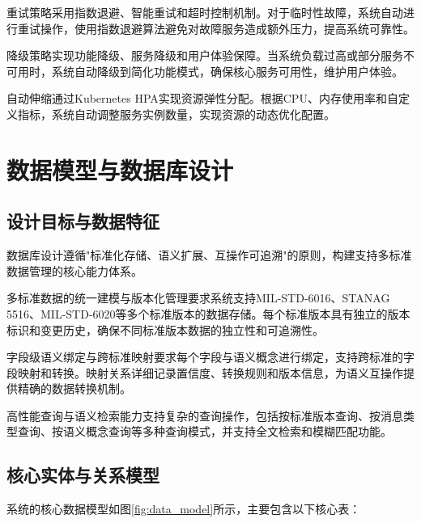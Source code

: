 重试策略采用指数退避、智能重试和超时控制机制。对于临时性故障，系统自动进行重试操作，使用指数退避算法避免对故障服务造成额外压力，提高系统可靠性。

降级策略实现功能降级、服务降级和用户体验保障。当系统负载过高或部分服务不可用时，系统自动降级到简化功能模式，确保核心服务可用性，维护用户体验。

自动伸缩通过Kubernetes HPA实现资源弹性分配。根据CPU、内存使用率和自定义指标，系统自动调整服务实例数量，实现资源的动态优化配置。

\section{数据模型与数据库设计}

\subsection{设计目标与数据特征}

数据库设计遵循"标准化存储、语义扩展、互操作可追溯"的原则，构建支持多标准数据管理的核心能力体系。

多标准数据的统一建模与版本化管理要求系统支持MIL-STD-6016、STANAG 5516、MIL-STD-6020等多个标准版本的数据存储。每个标准版本具有独立的版本标识和变更历史，确保不同标准版本数据的独立性和可追溯性。

字段级语义绑定与跨标准映射要求每个字段与语义概念进行绑定，支持跨标准的字段映射和转换。映射关系详细记录置信度、转换规则和版本信息，为语义互操作提供精确的数据转换机制。

高性能查询与语义检索能力支持复杂的查询操作，包括按标准版本查询、按消息类型查询、按语义概念查询等多种查询模式，并支持全文检索和模糊匹配功能。

\subsection{核心实体与关系模型}

系统的核心数据模型如图\ref{fig:data_model}所示，主要包含以下核心表：

